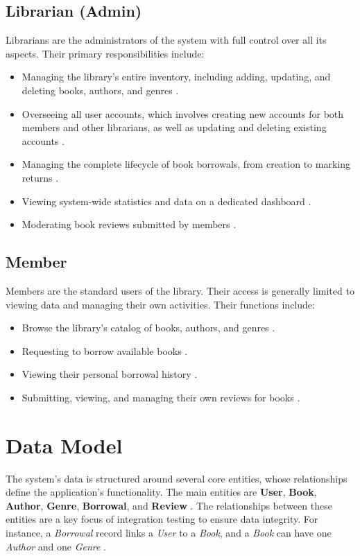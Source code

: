 \subsection{Librarian (Admin)}
Librarians are the administrators of the system with full control over all its aspects. Their primary responsibilities include:
\begin{itemize}
    \item Managing the library's entire inventory, including adding, updating, and deleting books, authors, and genres \cite{srs}.
    \item Overseeing all user accounts, which involves creating new accounts for both members and other librarians, as well as updating and deleting existing accounts \cite{srs}.
    \item Managing the complete lifecycle of book borrowals, from creation to marking returns \cite{srs}.
    \item Viewing system-wide statistics and data on a dedicated dashboard \cite{srs}.
    \item Moderating book reviews submitted by members \cite{srs}.
\end{itemize}

\subsection{Member}
Members are the standard users of the library. Their access is generally limited to viewing data and managing their own activities. Their functions include:
\begin{itemize}
    \item Browse the library's catalog of books, authors, and genres \cite{srs}.
    \item Requesting to borrow available books \cite{srs}.
    \item Viewing their personal borrowal history \cite{srs}.
    \item Submitting, viewing, and managing their own reviews for books \cite{srs}.
\end{itemize}

\section{Data Model}
\label{sec:data_model}
The system's data is structured around several core entities, whose relationships define the application's functionality. The main entities are \textbf{User}, \textbf{Book}, \textbf{Author}, \textbf{Genre}, \textbf{Borrowal}, and \textbf{Review} \cite{srs}. The relationships between these entities are a key focus of integration testing to ensure data integrity. For instance, a \textit{Borrowal} record links a \textit{User} to a \textit{Book}, and a \textit{Book} can have one \textit{Author} and one \textit{Genre} \cite{srs}.

